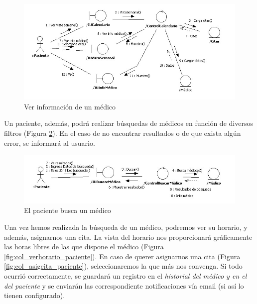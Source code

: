 \documentclass[a4paper,oneside,11pt]{book}
\begin{document}
			\begin{figure}[H]
			  \centering
			    \includegraphics[width=16cm]{img/jpg/colaboraciones/28_VerInfoMedico.jpg}
			  \caption{Ver información de un médico}
			  \label{fig:col_verinfo_medico_paciente}
			\end{figure}
			
			Un paciente, además, podrá realizar búsquedas de médicos en función de diversos filtros (Figura \ref{fig:col_buscarmedico_paciente}). En el caso de no encontrar resultados o de que exista algún error, se informará al usuario.
			
			\begin{figure}[H]
			  \centering
			    \includegraphics[width=16cm]{img/jpg/colaboraciones/29_PacienteBuscarMedico.jpg}
			  \caption{El paciente busca un médico}
			  \label{fig:col_buscarmedico_paciente}
			\end{figure}
			
			\bigskip
			\bigskip
			Una vez hemos realizada la búsqueda de un médico, podremos ver su horario, y además, asignarnos una cita. La vista del horario nos proporcionará gráficamente las horas libres de las que dispone el médico (Figura \ref{fig:col_verhorario_paciente}). En caso de querer asignarnos una cita (Figura \ref{fig:col_asigcita_paciente}), seleccionaremos la que más nos convenga. Si todo ocurrió correctamente, se guardará un registro en el \textit{historial del médico y en el del paciente} y se enviarán las correspondiente notificaciones vía email (si así lo tienen configurado).
			
\end{document}
